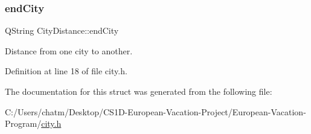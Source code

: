 \mbox{\label{struct_city_distance_a7f1fe8d0c76af2abf5bc5c6bd1800e7f}} 
\subsubsection{\texorpdfstring{endCity}{endCity}}
{\footnotesize\ttfamily Q\+String City\+Distance\+::end\+City}



Distance from one city to another. 



Definition at line 18 of file city.\+h.



The documentation for this struct was generated from the following file\+:\begin{DoxyCompactItemize}
\item 
C\+:/\+Users/chatm/\+Desktop/\+C\+S1\+D-\/\+European-\/\+Vacation-\/\+Project/\+European-\/\+Vacation-\/\+Program/\mbox{\hyperlink{city_8h}{city.\+h}}\end{DoxyCompactItemize}
